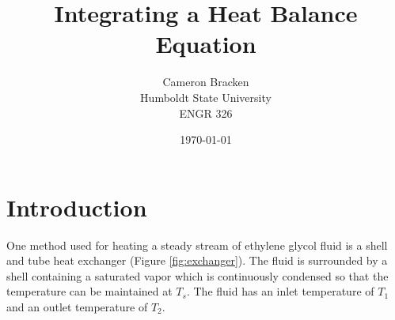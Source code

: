 \documentclass[titlepage,11pt]{article}
\begin{document}
\onehalfspace

\begin{singlespacing}
\title{Integrating a Heat Balance Equation}
\author{Cameron Bracken\\Humboldt State University\\ENGR 326}
\date{\today}
\maketitle
\newpage
{}\pagestyle{myheadings}
\tableofcontents{}
\listoffigures {}
\listoftables
\newpage
\end{singlespacing}
\pagestyle{headings}

\section {Introduction}
One method used for heating a steady stream of ethylene glycol fluid
is a shell and tube heat exchanger (Figure \ref{fig:exchanger}). The
fluid is surrounded by a shell containing a saturated vapor which is
continuously condensed so that the temperature can be maintained at
$T_s$. The fluid has an inlet temperature of $T_1$ and an outlet
temperature of $T_2$.
\end{document}
